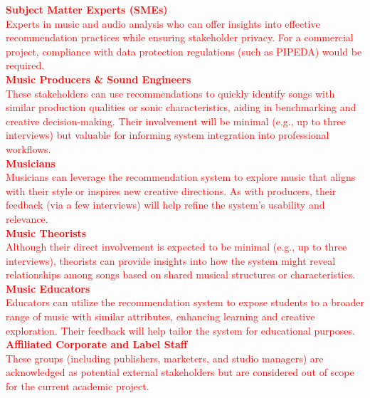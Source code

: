 \documentclass[12pt]{article}
\begin{document}
\noindent\textcolor{red}{\textbf{Subject Matter Experts (SMEs)}}\\
\textcolor{red}{Experts in music and audio analysis who can offer insights into effective recommendation practices while 
ensuring stakeholder privacy. For a commercial project, compliance with data protection regulations (such as PIPEDA) would be required.}\\
  
\noindent\textcolor{red}{\textbf{Music Producers \& Sound Engineers}}\\
\textcolor{red}{These stakeholders can use recommendations to quickly identify songs with similar production qualities or sonic characteristics, 
  aiding in benchmarking and creative decision-making. Their involvement will be minimal (e.g., up to three interviews) but valuable 
  for informing system integration into professional workflows.}\\
  
  \noindent\textcolor{red}{\textbf{Musicians}}\\
\textcolor{red}{Musicians can leverage the recommendation system to explore music that aligns with their style or inspires new creative directions. 
  As with producers, their feedback (via a few interviews) will help refine the system’s usability and relevance.}\\

  \noindent\textcolor{red}{\textbf{Music Theorists}}\\
\textcolor{red}{Although their direct involvement is expected to be minimal (e.g., up to three interviews), theorists can provide insights into how 
  the system might reveal relationships among songs based on shared musical structures or characteristics.}\\

  \noindent\textcolor{red}{\textbf{Music Educators}}\\
\textcolor{red}{Educators can utilize the recommendation system to expose students to a broader range of music with similar attributes, enhancing 
  learning and creative exploration. Their feedback will help tailor the system for educational purposes.}\\

  \noindent\textcolor{red}{\textbf{Affiliated Corporate and Label Staff}}\\
\textcolor{red}{These groups (including publishers, marketers, and studio managers) are acknowledged as potential external stakeholders but are
  considered out of scope for the current academic project.}\\
\end{document}

